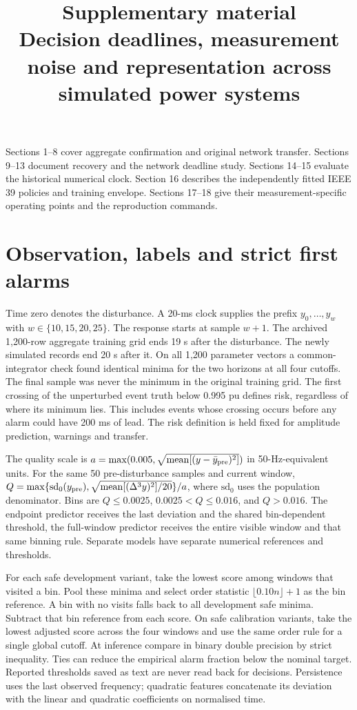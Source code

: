 \documentclass[10pt]{article}
\title{Supplementary material\\\large Decision deadlines, measurement noise and representation across simulated power systems}
\author{}\date{}
\begin{document}
\maketitle\vspace{-2.5em}
\noindent Sections 1--8 cover aggregate confirmation and original network transfer. Sections 9--13 document recovery and the network deadline study. Sections 14--15 evaluate the historical numerical clock. Section 16 describes the independently fitted IEEE 39 policies and training envelope. Sections 17--18 give their measurement-specific operating points and the reproduction commands.
\section{Observation, labels and strict first alarms}
Time zero denotes the disturbance. A 20-ms clock supplies the prefix $y_0,\ldots,y_w$ with $w\in\{10,15,20,25\}$. The response starts at sample $w+1$. The archived 1,200-row aggregate training grid ends 19 s after the disturbance. The newly simulated records end 20 s after it. On all 1,200 parameter vectors a common-integrator check found identical minima for the two horizons at all four cutoffs. The final sample was never the minimum in the original training grid. The first crossing of the unperturbed event truth below 0.995 pu defines risk, regardless of where its minimum lies. This includes events whose crossing occurs before any alarm could have 200 ms of lead. The risk definition is held fixed for amplitude prediction, warnings and transfer.

The quality scale is $a=\max(0.005,\sqrt{\mathrm{mean}[(y-\bar y_{\rm pre})^2]})$ in 50-Hz-equivalent units. For the same 50 pre-disturbance samples and current window, $Q=\max\{\mathrm{sd}_0(y_{\rm pre}),\sqrt{\mathrm{mean}[(\Delta^3y)^2]/20}\}/a$, where $\mathrm{sd}_0$ uses the population denominator. Bins are $Q\le0.0025$, $0.0025<Q\le0.016$, and $Q>0.016$. The endpoint predictor receives the last deviation and the shared bin-dependent threshold, the full-window predictor receives the entire visible window and that same binning rule. Separate models have separate numerical references and thresholds.

For each safe development variant, take the lowest score among windows that visited a bin. Pool these minima and select order statistic $\lfloor0.10n\rfloor+1$ as the bin reference. A bin with no visits falls back to all development safe minima. Subtract that bin reference from each score. On safe calibration variants, take the lowest adjusted score across the four windows and use the same order rule for a single global cutoff. At inference compare in binary double precision by strict inequality. Ties can reduce the empirical alarm fraction below the nominal target. Reported thresholds saved as text are never read back for decisions. Persistence uses the last observed frequency; quadratic features concatenate its deviation with the linear and quadratic coefficients on normalised time.
\end{document}
